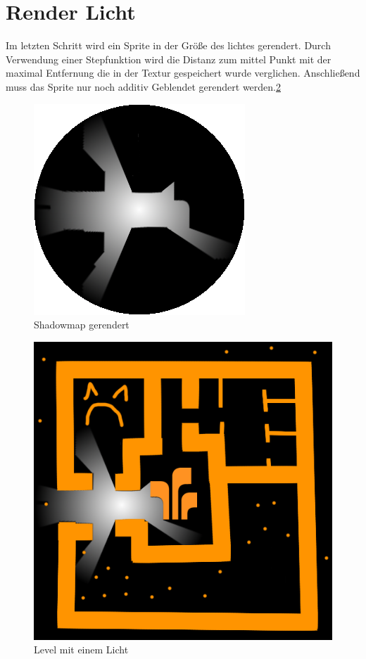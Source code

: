 \section{Render Licht}
Im letzten Schritt wird ein Sprite in der Größe des lichtes gerendert. Durch Verwendung einer Stepfunktion wird die Distanz zum mittel Punkt mit der maximal Entfernung die in der Textur gespeichert wurde verglichen.
Anschließend muss das Sprite nur noch additiv Geblendet gerendert werden.\ref{level_licht_1}
\begin{figure}
	\centering
	\includegraphics{images/shadow_shadow_2.png}
	\caption{Shadowmap gerendert}
	\label{shadows_1}
\end{figure}
\begin{figure}
	\centering
	\includegraphics[scale=0.75]{images/final.png}
	\caption{Level mit einem Licht}
	\label{level_licht_1}
\end{figure}